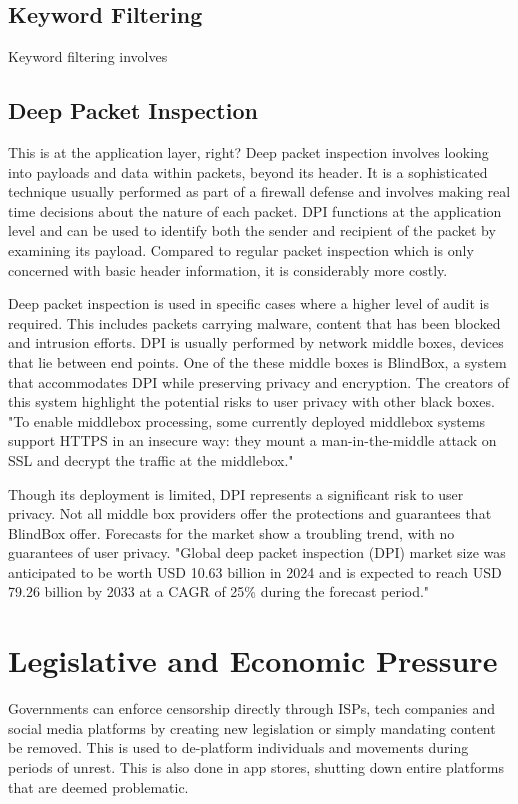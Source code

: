 \subsection{Keyword Filtering}
Keyword filtering involves 

\subsection{Deep Packet Inspection}

This is at the application layer, right?
Deep packet inspection involves looking into payloads and data within packets, beyond its header. It is a sophisticated technique usually performed as part of a firewall defense and involves making real time decisions about the nature of each packet. DPI functions at the application level and can be used to identify both the sender and recipient of the packet by examining its payload. Compared to regular packet inspection which is only concerned with basic header information, it is considerably more costly. 

Deep packet inspection is used in specific cases where a higher level of audit is required. This includes packets carrying malware, content that has been blocked and intrusion efforts. DPI is usually performed by network middle boxes, devices that lie between end points. One of the these middle boxes is BlindBox, a system that accommodates DPI while preserving privacy and encryption. The creators of this system highlight the potential risks to user privacy with other black boxes. "To enable middlebox processing, some currently deployed middlebox systems support HTTPS in
an insecure way: they mount a man-in-the-middle attack on SSL and decrypt the traffic at the middlebox." \cite{sherry2015blindbox}

Though its deployment is limited, DPI represents a significant risk to user privacy. Not all middle box providers offer the protections and guarantees that BlindBox offer. Forecasts for the market show a troubling trend, with no guarantees of user privacy. "Global deep packet inspection (DPI) market size was anticipated to be worth USD 10.63 billion in 2024 and is expected to reach USD 79.26 billion by 2033 at a CAGR of 25\% during the forecast period." \cite{DPIMarketInfo}

\section{Legislative and Economic Pressure}
Governments can enforce censorship directly through ISPs, tech companies and social media platforms by creating new legislation or simply mandating content be removed. This is used to de-platform individuals and movements during periods of unrest. This is also done in app stores, shutting down entire platforms that are deemed problematic.

